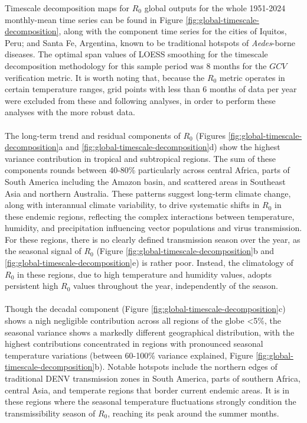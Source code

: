 \documentclass[10pt,twocolumn]{wlscirep}
\begin{document}
Timescale decomposition maps for $R_0$ global outputs for the whole 1951-2024 monthly-mean time series can be found in Figure \ref{fig:global-timescale-decomposition}, along with the component time series for the cities of Iquitos, Peru; and Santa Fe, Argentina, known to be traditional hotspots of \textit{Aedes}-borne diseases. The optimal span values of LOESS smoothing for the timescale decomposition methodology for this sample period was 8 months for the $GCV$ verification metric. It is worth noting that, because the $R_0$ metric operates in certain temperature ranges, grid points with less than 6 months of data per year were excluded from these and following analyses, in order to perform these analyses with the more robust data.
\\
\\
The long-term trend and residual components of $R_0$ (Figures \ref{fig:global-timescale-decomposition}a and \ref{fig:global-timescale-decomposition}d) show the highest variance contribution in tropical and subtropical regions. The sum of these components rounds between 40-80\% particularly across central Africa, parts of South America including the Amazon basin, and scattered areas in Southeast Asia and northern Australia. These patterns suggest long-term climate change, along with interannual climate variability, to drive systematic shifts in $R_0$ in these endemic regions, reflecting the complex interactions between temperature, humidity, and precipitation influencing vector populations and virus transmission. For these regions, there is no clearly defined transmission season over the year, as the seasonal signal of $R_0$ (Figure \ref{fig:global-timescale-decomposition}b and \ref{fig:global-timescale-decomposition}e) is rather poor. Instead, the climatology of $R_0$ in these regions, due to high temperature and humidity values, adopts persistent high $R_0$ values throughout the year, independently of the season.
\\
\\
Though the decadal component (Figure \ref{fig:global-timescale-decomposition}c) shows a nigh negligible contribution across all regions of the globe <5\%, the seasonal variance shows a markedly different geographical distribution, with the highest contributions concentrated in regions with pronounced seasonal temperature variations (between 60-100\% variance explained, Figure \ref{fig:global-timescale-decomposition}b). Notable hotspots include the northern edges of traditional DENV transmission zones in South America, parts of southern Africa, central Asia, and temperate regions that border current endemic areas. It is in these regions where the seasonal temperature fluctuations strongly condition the transmissibility season of $R_0$, reaching its peak around the summer months.
\end{document}
